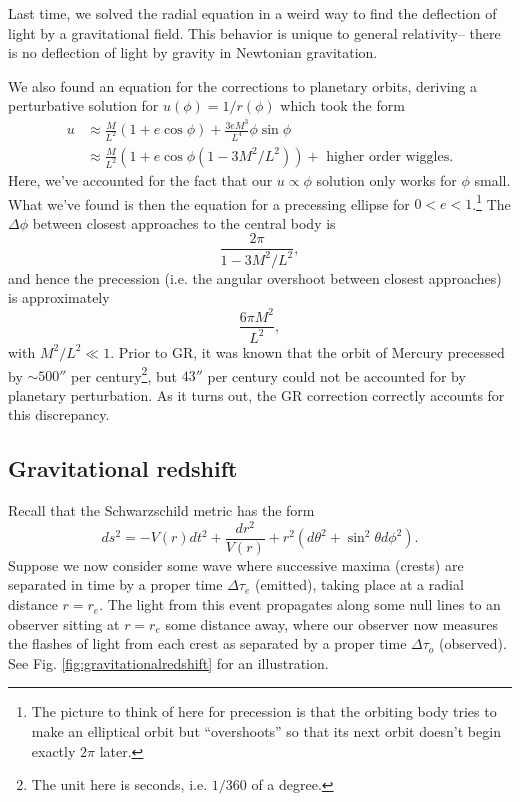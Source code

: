 Last time, we solved the radial equation in a weird way to find the deflection of light by a gravitational field. This behavior is unique to general relativity-- there is no deflection of light by gravity in Newtonian gravitation.

We also found an equation for the corrections to planetary orbits, deriving a perturbative solution for $u(\phi)=1/r(\phi)$ which took the form
\begin{align*}
u&\approx \frac{M}{L^2}(1+e\cos\phi)+\frac{3eM^3}{L^4}\phi \sin\phi\\
&\approx \frac{M}{L^2}(1+e\cos\phi(1-3M^2/L^2))+\text{ higher order wiggles}.
\end{align*}
Here, we've accounted for the fact that our $u\propto \phi$ solution only works for $\phi$ small. What we've found is then the equation for a precessing ellipse for $0<e<1$.\footnote{The picture to think of here for precession is that the orbiting body tries to make an elliptical orbit but ``overshoots'' so that its next orbit doesn't begin exactly $2\pi$ later.} The $\Delta \phi$ between closest approaches to the central body is
$$\frac{2\pi}{1-3M^2/L^2},$$
and hence the precession (i.e. the angular overshoot between closest approaches) is approximately
$$\frac{6\pi M^2}{L^2},$$
with $M^2/L^2\ll1$. Prior to GR, it was known that the orbit of Mercury precessed by $\sim 500''$ per century\footnote{The unit here is seconds, i.e. $1/360$ of a degree.}, but $43''$ per century could not be accounted for by planetary perturbation. As it turns out, the GR correction correctly accounts for this discrepancy.

\subsection*{Gravitational redshift} Recall that the Schwarzschild metric has the form
$$ds^2=-V(r)dt^2+\frac{dr^2}{V(r)}+r^2(d\theta^2+\sin^2\theta d\phi^2).$$
Suppose we now consider some wave where successive maxima (crests) are separated in time by a proper time $\Delta \tau_e$ (emitted), taking place at a radial distance $r=r_e$. The light from this event propagates along some null lines to an observer sitting at $r=r_e$ some distance away, where our observer now measures the flashes of light from each crest as separated by a proper time $\Delta \tau_o$ (observed). See Fig. \ref{fig:gravitationalredshift} for an illustration.

